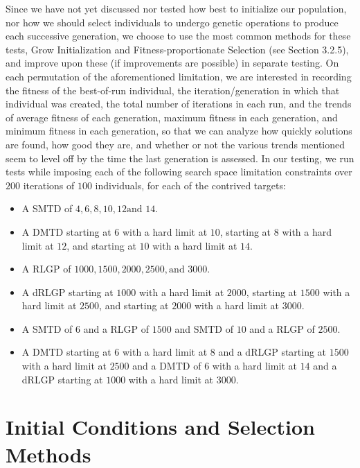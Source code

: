 \documentclass[12pt]{report} 	%
\numberwithin{figure}{chapter}
\numberwithin{table}{chapter}
\numberwithin{equation}{chapter}
\begin{document}
\begin{flushleft}
Since we have not yet discussed nor tested how best to initialize our population, nor how we should select individuals to undergo genetic operations to produce each successive generation, we choose to use the most common methods for these tests, Grow Initialization and Fitness-proportionate Selection (see Section 3.2.5), and improve upon these (if improvements are possible) in separate testing. On each permutation of the aforementioned limitation, we are interested in recording the fitness of the best-of-run individual, the iteration/generation in which that individual was created, the total number of iterations in each run, and the trends of average fitness of each generation, maximum fitness in each generation, and minimum fitness in each generation, so that we can analyze how quickly solutions are found, how good they are, and whether or not the various trends mentioned seem to level off by the time the last generation is assessed. In our testing, we run tests while imposing each of the following search space limitation constraints over $200$ iterations of $100$ individuals, for each of the contrived targets:
\begin{itemize}
\item A SMTD of $4,6,8, 10, 12 \text{and }14$.
\item A DMTD starting at $6$ with a hard limit at $10$, starting at $8$ with a hard limit at $12$, and starting at $10$ with a hard limit at $14$.
\item A RLGP of $1000, 1500, 2000, 2500, \text{and } 3000$.
\item A dRLGP starting at $1000$ with a hard limit at $2000$, starting at $1500$ with a hard limit at $2500$, and starting at $2000$ with a hard limit at $3000$.
\item A SMTD of $6$ and a RLGP of $1500$ and SMTD of $10$ and a RLGP of $2500$.
\item A DMTD starting at $6$ with a hard limit at $8$ and a dRLGP starting at $1500$ with a hard limit at $2500$ and a DMTD of $6$ with a hard limit at $14$ and a dRLGP starting at  $1000$ with a hard limit at $3000$.
\end{itemize}

\section{Initial Conditions and Selection Methods}


\end{flushleft}
\end{document}
